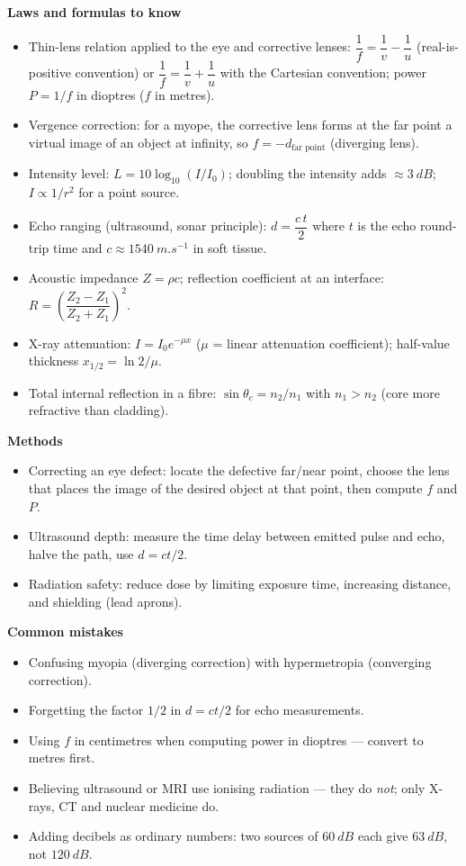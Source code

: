 \documentclass[11pt]{article}
\newcommand{\cle}[1]{{\popxbold\color{popdark}#1}}
\begin{document}
\begin{bilan}
\textbf{Laws and formulas to know}
\begin{itemize}
\item Thin-lens relation applied to the eye and corrective lenses: $\dfrac{1}{f} = \dfrac{1}{v} - \dfrac{1}{u}$ (real-is-positive convention) or $\dfrac{1}{f}=\dfrac{1}{v}+\dfrac{1}{u}$ with the Cartesian convention; power $P = 1/f$ in dioptres ($f$ in metres).
\item Vergence correction: for a myope, the corrective lens forms at the far point a virtual image of an object at infinity, so $f = -d_{\text{far point}}$ (diverging lens).
\item Intensity level: $L = 10\log_{10}(I/I_0)$; doubling the intensity adds $\approx \SI{3}{dB}$; $I \propto 1/r^2$ for a point source.
\item Echo ranging (ultrasound, sonar principle): $d = \dfrac{c\,t}{2}$ where $t$ is the echo round-trip time and $c \approx \SI{1540}{m.s^{-1}}$ in soft tissue.
\item Acoustic impedance $Z = \rho c$; reflection coefficient at an interface: $R = \left(\dfrac{Z_2 - Z_1}{Z_2 + Z_1}\right)^2$.
\item X-ray attenuation: $I = I_0 e^{-\mu x}$ ($\mu$ = linear attenuation coefficient); half-value thickness $x_{1/2} = \ln 2 / \mu$.
\item Total internal reflection in a fibre: $\sin\theta_c = n_2/n_1$ with $n_1 > n_2$ (core more refractive than cladding).
\end{itemize}

\textbf{Methods}
\begin{itemize}
\item \cle{Correcting an eye defect}: locate the defective far/near point, choose the lens that places the image of the desired object at that point, then compute $f$ and $P$.
\item \cle{Ultrasound depth}: measure the time delay between emitted pulse and echo, halve the path, use $d = ct/2$.
\item \cle{Radiation safety}: reduce dose by limiting exposure time, increasing distance, and shielding (lead aprons).
\end{itemize}

\textbf{Common mistakes}
\begin{itemize}
\item Confusing myopia (diverging correction) with hypermetropia (converging correction).
\item Forgetting the factor $1/2$ in $d = ct/2$ for echo measurements.
\item Using $f$ in centimetres when computing power in dioptres --- convert to metres first.
\item Believing ultrasound or MRI use ionising radiation --- they do \emph{not}; only X-rays, CT and nuclear medicine do.
\item Adding decibels as ordinary numbers: two sources of $\SI{60}{dB}$ each give $\SI{63}{dB}$, not $\SI{120}{dB}$.
\end{itemize}


\end{bilan}
\end{document}
